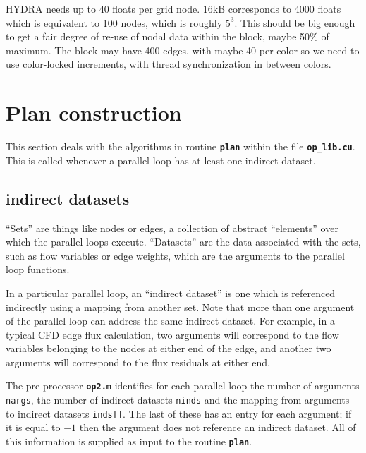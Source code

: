 \documentclass[12pt]{article}
\begin{document}
HYDRA needs up to 40 floats per grid node.  16kB corresponds
to 4000 floats which is equivalent to 100 nodes, which is 
roughly $5^3$.  This should be big enough to get a fair degree 
of re-use of nodal data within the block, maybe 50\% of
maximum.  The block may have 400 edges, with maybe 40 per 
color so we need to use color-locked increments, with thread 
synchronization in between colors.


\newpage

\section{Plan construction}

This section deals with the algorithms in routine {\tt \bf plan} 
within the file {\tt \bf op\_lib.cu}.  This is called whenever a
parallel loop has at least one indirect dataset.

\subsection{indirect datasets}

``Sets'' are things like nodes or edges, a collection of abstract 
``elements'' over which the parallel loops execute.
``Datasets'' are the data associated with the sets, such as flow 
variables or edge weights, which are the arguments to the parallel 
loop functions.

In a particular parallel loop, an ``indirect dataset'' is one which 
is referenced indirectly using a mapping from another set.  Note that 
more than one argument of the parallel loop can address the same 
indirect dataset.  For example, in a typical CFD edge flux calculation, 
two arguments will correspond to the flow variables belonging to the 
nodes at either end of the edge, and another two arguments will 
correspond to the flux residuals at either end.

The pre-processor {\tt \bf op2.m} identifies for each parallel loop
the number of arguments {\tt nargs}, the number of indirect datasets
{\tt ninds} and the mapping from arguments to indirect datasets 
{\tt inds[]}.   The last of these has an entry for each argument; 
if it is equal to $-1$ then the argument does not reference an 
indirect dataset.
All of this information is supplied as input to the routine 
{\tt \bf plan}.
\end{document}
